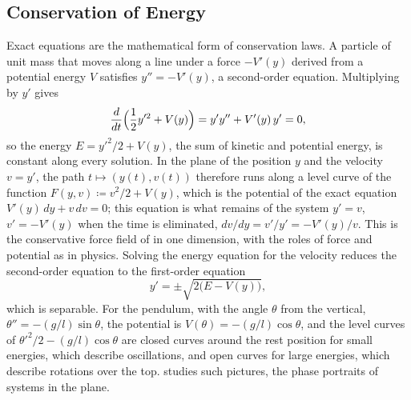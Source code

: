 \begin{figure}
\end{figure}

\subsection{Conservation of Energy}

Exact equations are the mathematical form of conservation laws. A particle of unit mass that moves along a line under a force $-V'(y)$ derived from a potential energy $V$ satisfies $y''=-V'(y)$, a second-order equation. Multiplying by $y'$ gives
\[
\frac d{dt}\Bigl(\frac12y'^2+V(y)\Bigr)=y'y''+V'(y)\,y'=0 ,
\]
so the energy $E=y'^2/2+V(y)$, the sum of kinetic and potential energy, is constant along every solution. In the plane of the position $y$ and the velocity $v=y'$, the path $t\mapsto(y(t),v(t))$ therefore runs along a level curve of the function $F(y,v)\coloneqq v^2/2+V(y)$, which is the potential of the exact equation $V'(y)\,dy+v\,dv=0$; this equation is what remains of the system $y'=v$, $v'=-V'(y)$ when the time is eliminated, $dv/dy=v'/y'=-V'(y)/v$. This is the conservative force field of  in one dimension, with the roles of force and potential as in physics. Solving the energy equation for the velocity reduces the second-order equation to the first-order equation
\[
y'=\pm\sqrt{2\bigl(E-V(y)\bigr)},
\]
which is separable. For the pendulum, with the angle $\theta$ from the vertical, $\theta''=-(g/l)\sin\theta$, the potential is $V(\theta)=-(g/l)\cos\theta$, and the level curves of $\theta'^2/2-(g/l)\cos\theta$ are closed curves around the rest position for small energies, which describe oscillations, and open curves for large energies, which describe rotations over the top.  studies such pictures, the phase portraits of systems in the plane.


